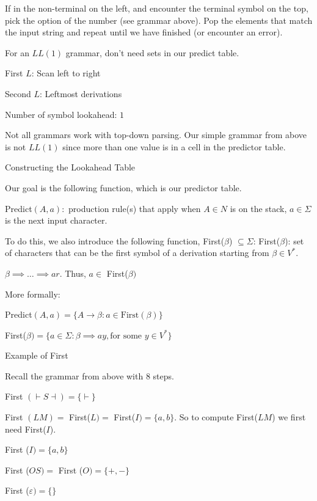 \documentclass{article}
\begin{document}
If in the non-terminal on the left, and encounter the terminal symbol on
the top, pick the option of the number (see grammar above). Pop the
elements that match the input string and repeat until we have finished
(or encounter an error).


For an \(LL(1)\) grammar, don't need sets in our predict table.


First \(L\): Scan left to right

Second \(L\): Leftmost derivations

Number of symbol lookahead: \(1\)

Not all grammars work with top-down parsing. Our simple grammar from
above is not \(LL(1)\) since more than one value is in a cell in the
predictor table.

Constructing the Lookahead Table

Our goal is the following function, which is our predictor table.

Predict\((A,a):\) production rule(s) that apply when \(A \in N\) is on
the stack, \(a \in \Sigma\) is the next input character.

To do this, we also introduce the following function, First(\(\beta\))
\(\subseteq \Sigma\): First(\(\beta\)): set of characters that can be
the first symbol of a derivation starting from \(\beta \in V^*\).

\(\beta \implies \ldots \implies ar\). Thus, \(a \in\) First(\(\beta)\)

More formally:

Predict\((A,a) = \{A \to \beta: a \in \text{First}(\beta)\}\)

First(\(\beta) = \{a \in \Sigma: \beta \implies ay, \text{for some } y \in V^*\}\)

Example of First

Recall the grammar from above with 8 steps.

First \((\vdash S \dashv) = \{\vdash\}\)

First \((L M) =\) First(\(L) =\) First(\(I) = \{a, b\}\). So to compute
First(\(LM\)) we first need First(\(I\)).

First (\(I) = \{a,b\}\)

First (\(O S) =\) First (\(O) = \{+, -\}\)

First (\(\varepsilon) = \{\}\)
\end{document}
